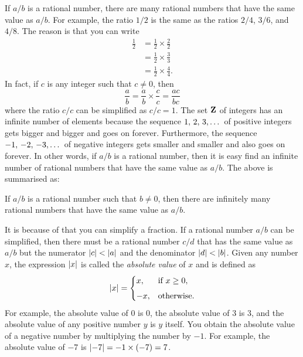 \documentclass[a4paper,oneside,12pt]{article}
\begin{document}

If $a/b$ is a rational number, there are many rational numbers that
have the same value as $a/b$.  For example, the ratio $1/2$ is the
same as the ratios $2/4$, $3/6$, and $4/8$.  The reason is that you
can write
\begin{align*}
\frac{1}{2}
&=
\frac{1}{2} \times \frac{2}{2} \\[4pt]
&=
\frac{1}{2} \times \frac{3}{3} \\[4pt]
&=
\frac{1}{2} \times \frac{4}{4}.
\end{align*}
In fact, if $c$ is any integer such that $c \neq 0$, then
\[
\frac{a}{b}
=
\frac{a}{b} \times \frac{c}{c}
=
\frac{ac}{bc}
\]
where the ratio $c/c$ can be simplified as $c/c = 1$.  The set $\mathbf{Z}$
of integers has an infinite number of elements because the sequence
${1},\, {2},\, {3},\dots$ of positive integers gets bigger and bigger and goes
on forever.  Furthermore, the sequence ${-1},\, {-2},\, {-3},\dots$ of negative
integers gets smaller and smaller and also goes on forever.  In other
words, if $a/b$ is a rational number, then it is easy find an infinite
number of rational numbers that have the same value as $a/b$.  The
above is summarised as:

\begin{theorem}
\label{thm:infinitely_many_rationals_same_value}
If $a/b$ is a rational number such that $b \neq 0$, then there are
infinitely many rational numbers that have the same value as $a/b$.
\end{theorem}

It is because of 
that you can simplify a fraction.  If a rational number $a/b$ can be
simplified, then there must be a rational number $c/d$ that has the
same value as $a/b$ but the numerator
$\lvert c\rvert < \lvert a\rvert$ and the denominator
$\lvert d\rvert < \lvert b\rvert$.  Given any number $x$, the
expression $\lvert x\rvert$ is called the \emph{absolute value} of
$x$ and is defined as
\[
\lvert x\rvert
=
\begin{cases}
x,  & \text{if $x \geq 0$}, \\[4pt]
-x, & \text{otherwise}.
\end{cases}
\]
For example, the absolute value of $0$ is $0$, the absolute value of
$3$ is $3$, and the absolute value of any positive number $y$ is $y$
itself.  You obtain the absolute value of a negative number by
multiplying the number by $-1$.  For example, the absolute value of
$-7$ is $\lvert-7\rvert = -1 \times (-7) = 7$.
\end{document}
